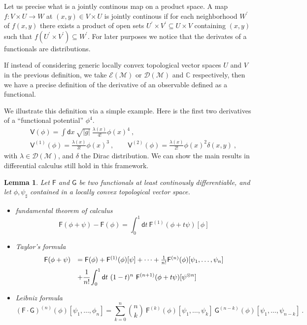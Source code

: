 \documentclass[12pt]{book}
\newcommand{\abs}[1]{\left|#1\right|}
\let\int\int
\def\bigint{\displaystyle\int}
\newcommand{\Dcal}{\mathcal{D}}
\newcommand{\Ecal}{\mathcal{E}}
\newcommand{\Mcal}{\mathcal{M}}
\newcommand{\Cbb}{\mathbb{C}}
\newcommand{\Fsf}{\mathsf{F}}
\newcommand{\Gsf}{\mathsf{G}}
\newcommand{\Vsf}{\mathsf{V}}
\newcommand{\dsf}{\mathsf{d}}
\theoremstyle{break}
\newtheorem{lemma}{Lemma}
\begin{document}
Let us precise what is a jointly continous map on a product space. A map $f : V \times U \to W$ at $(x,y) \in V \times U$ is jointly continous if for each neighborhood $W^\prime$ of $f(x,y)$ there exists a product of open sets $U^\prime \times V^\prime \subseteq U \times V$ containing $(x,y)$ such that $f(U^\prime \times V^\prime) \subseteq W^\prime$. For later purposes we notice that the derivates of a functionals are distributions.




If instead of considering generic locally convex topological vector spaces $U$ and $V$ in the previous definition, we take $\Ecal(\Mcal)$ or $\Dcal(\Mcal)$ and $\Cbb$ respectively, then we have a precise definition of the derivative of an observable defined as a functional.




We illustrate this definition via a simple example. Here is the first two derivatives of a ``functional potential'' $\phi^4$. 
%
\begin{eqnarray}
&& \Vsf(\phi) = \int \dsf x \ \sqrt{\abs{g}} \ \frac{\lambda(x)}{4!} \phi(x)^4 \ ,
\label{eq:pot_quartic}
\\
%
&& \Vsf^{(1)}(\phi) = \frac{\lambda(x)}{3!} \phi(x)^3 \ , \qquad
%
\Vsf^{(2)}(\phi) = \frac{\lambda(x)}{2!} \phi(x)^2 \delta(x,y) \ , \nonumber
\end{eqnarray}
%
with $\lambda \in \Dcal(\Mcal)$, and $\delta$ the Dirac distribution. We can show the main results in differential calculus still hold in this framework.




\begin{lemma}
%
Let $\Fsf$ and $\Gsf$ be two functionals at least continously differentiable, and let $\phi , \psi_{\sharp}$ contained in a locally convex topological vector space. 
%
\begin{itemize}
%
\item fundamental theorem of calculus
\begin{equation*}
\Fsf(\phi + \psi) - \Fsf(\phi) = \int_0^1 \dsf t \ \Fsf^{(1)}(\phi+t\psi)[\phi] 
\end{equation*}
%
\item Taylor's formula
\begin{equation*}
\begin{array}{ll}
\Fsf(\phi + \psi)& = \Fsf(\phi) + \Fsf^{(1)}(\phi)[\psi] + \dots + \frac{1}{n!} \Fsf^{(n)}(\phi)[\psi_1,\dots,\psi_n] \\[6pt]
&+ \cfrac{1}{n!} \bigint_0^1 \dsf t \ (1-t)^n \ \Fsf^{(n+1)}(\phi+t\psi)[\psi^{\otimes n}]
\end{array}
\end{equation*}
%
\item Leibniz formula
\begin{equation*}
\left(\Fsf \cdot \Gsf\right)^{(n)}(\phi)[\psi_1, \dots ,\phi_n] = \sum_{k=0}^{n} \binom{n}{k} \ \Fsf^{(k)}(\phi)[\psi_1, \dots , \psi_k] \ \Gsf^{(n-k)}(\phi)[\psi_1, \dots , \psi_{n-k}] \ .
\end{equation*}
%
\end{itemize}
%
\end{lemma}
\end{document}
